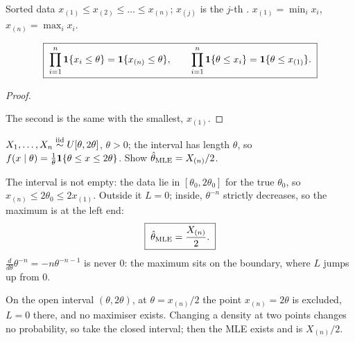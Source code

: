\begin{definition}
Sorted data $x_{(1)}\le x_{(2)}\le\dots\le x_{(n)}$; $x_{(j)}$ is the $j$-th . $x_{(1)}=\min_ix_i$, $x_{(n)}=\max_ix_i$.
\end{definition}

\begin{result}
\[
  \boxed{\;\prod_{i=1}^n\mathbf{1}\{x_i\le\theta\}=\mathbf{1}\{x_{(n)}\le\theta\},\qquad\prod_{i=1}^n\mathbf{1}\{\theta\le x_i\}=\mathbf{1}\{\theta\le x_{(1)}\}.\;}
\]
\end{result}
\begin{proof}
\begin{deriv}
\end{deriv}
The second is the same with the smallest, $x_{(1)}$.
\end{proof}

\begin{example}
$X_1,\dots,X_n\overset{\text{iid}}{\sim} U[\theta,2\theta]$, $\theta>0$; the interval has length $\theta$, so $f(x\mid\theta)=\frac1\theta\mathbf{1}\{\theta\le x\le2\theta\}$. Show $\hat\theta_{\mathrm{MLE}}=X_{(n)}/2$.
\begin{deriv}
\end{deriv}
The interval is not empty: the data lie in $[\theta_0,2\theta_0]$ for the true $\theta_0$, so $x_{(n)}\le2\theta_0\le2x_{(1)}$. Outside it $L=0$; inside, $\theta^{-n}$ strictly decreases, so the maximum is at the left end:
\[
  \boxed{\;\hat\theta_{\mathrm{MLE}}=\frac{X_{(n)}}{2}.\;}
\]
$\frac{d}{d\theta}\theta^{-n}=-n\theta^{-n-1}$ is never $0$: the maximum sits on the boundary, where $L$ jumps up from $0$.
\end{example}

\begin{remark}
On the open interval $(\theta,2\theta)$, at $\theta=x_{(n)}/2$ the point $x_{(n)}=2\theta$ is excluded, $L=0$ there, and no maximiser exists. Changing a density at two points changes no probability, so take the closed interval; then the MLE exists and is $X_{(n)}/2$.
\end{remark}

